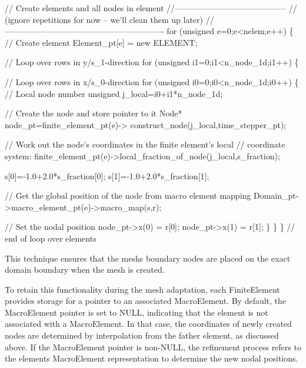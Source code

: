  
\begin{DoxyCodeInclude}
 \textcolor{comment}{// Create elements and all nodes in element}
 \textcolor{comment}{//-----------------------------------------}
 \textcolor{comment}{// (ignore repetitions for now -- we'll clean them up later)}
 \textcolor{comment}{//----------------------------------------------------------}
 \textcolor{keywordflow}{for} (\textcolor{keywordtype}{unsigned} e=0;e<nelem;e++)
  \{
   \textcolor{comment}{// Create element}
   Element\_pt[e] = \textcolor{keyword}{new} ELEMENT;
   
   \textcolor{comment}{// Loop over rows in y/s\_1-direction}
   \textcolor{keywordflow}{for} (\textcolor{keywordtype}{unsigned} i1=0;i1<n\_node\_1d;i1++)
    \{
     
     \textcolor{comment}{// Loop over rows in x/s\_0-direction}
     \textcolor{keywordflow}{for} (\textcolor{keywordtype}{unsigned} i0=0;i0<n\_node\_1d;i0++)
      \{
       \textcolor{comment}{// Local node number}
       \textcolor{keywordtype}{unsigned} j\_local=i0+i1*n\_node\_1d;
       
       \textcolor{comment}{// Create the node and store pointer to it}
       Node* node\_pt=finite\_element\_pt(e)->
        construct\_node(j\_local,time\_stepper\_pt);

       \textcolor{comment}{// Work out the node's coordinates in the finite element's local}
       \textcolor{comment}{// coordinate system:}
       finite\_element\_pt(e)->local\_fraction\_of\_node(j\_local,s\_fraction);
       
       s[0]=-1.0+2.0*s\_fraction[0];
       s[1]=-1.0+2.0*s\_fraction[1];

       \textcolor{comment}{// Get the global position of the node from macro element mapping}
       Domain\_pt->macro\_element\_pt(e)->macro\_map(s,r);
       
       \textcolor{comment}{// Set the nodal position}
       node\_pt->x(0) = r[0];
       node\_pt->x(1) = r[1];
      \}
    \}
  \} \textcolor{comment}{// end of loop over elements}

\end{DoxyCodeInclude}


This technique ensures that the mesh\textquotesingle{}s boundary nodes are placed on the exact domain boundary when the mesh is created.

To retain this functionality during the mesh adaptation, each {\ttfamily Finite\+Element} provides storage for a pointer to an associated {\ttfamily Macro\+Element}. By default, the {\ttfamily Macro\+Element} pointer is set to {\ttfamily N\+U\+LL}, indicating that the element is not associated with a {\ttfamily Macro\+Element}. In that case, the coordinates of newly created nodes are determined by interpolation from the father element, as discussed above. If the {\ttfamily Macro\+Element} pointer is non-\/{\ttfamily N\+U\+LL}, the refinement process refers to the element\textquotesingle{}s {\ttfamily Macro\+Element} representation to determine the new nodal positions.

